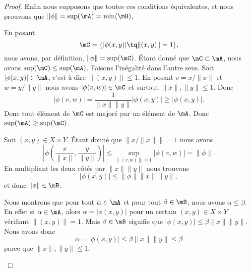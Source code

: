 \begin{proof}
    Enfin nous supposons que toutes ces conditions équivalentes, et nous prouvons que \( \| \phi \|=\sup(\mA)=\min(\mB)\).

    \begin{subproof}
        \spitem[\( \| \phi \|=\sup(\mA)\)]
        En posant
        \begin{equation}
            \mC=\{ | \phi(x,y) |\tq \| (x,y) \|=1 \}, 
        \end{equation}
        nous avons, par définition, \( \| \phi \|=\sup(\mC)\). Étant donné que \( \mC\subset\mA\), nous avons \( \sup(\mC)\leq \sup(\mA)\). Faisons l'inégalité dans l'autre sens. Soit \( | \phi(x,y) |\in\mA\), c'est à dire \( \| (x,y) \|\leq 1\). En posant \( v=x/\| x \|\) et \( w=y/\| y \|\) nous avons \( | \phi(v,w) |\in\mC\) et surtout \( \| x \|, \| y \|\leq 1\). Donc
        \begin{equation}
            | \phi(v,w) |=\frac{1}{ \| x \|\| y \| }| \phi(x,y) |\geq | \phi(x,y) |.
        \end{equation}
        Donc tout élément de \( \mC\) est majoré par un élément de \( \mA\). Donc \( \sup(\mA)\geq \sup(\mC)\).

        \spitem[\( \| \phi \|\in\mB\)]
    Soit \( (x,y)\in X\times Y\). Étant donné que \( \| x/\| x \| \|=1\) nous avons
    \begin{equation}
    \left| \phi\left( \frac{ x }{ \| x \| },\frac{ y }{ \| y \| } \right) \right|\leq \sup_{\| (v,w) \|=1}| \phi(v,w) |= \| \phi \|.
    \end{equation}
    En multipliant les deux côtés par \( \| x \|\| y \|\) nous trouvons
    \begin{equation}
        \left|   \phi(x,y) \right|\leq \| \phi \|\| x \|\| y \|,
    \end{equation}
    et donc \( \| \phi \|\in\mB\). 

    Nous montrons que pour tout \( \alpha\in \mA\) et pour tout \( \beta\in\mB\), nous avons \( \alpha\leq \beta\). En effet si \( \alpha\in \mA\), alors \( \alpha=| \phi(x,y) |\) pour un certain \( (x,y)\in X\times Y\) vérifiant \( \| (x,y) \|=1\). Mais \( \beta\in \mB\) signifie que \( | \phi(x,y)|\leq \beta\| x \|  \| y \| \). Nous avons donc
    \begin{equation}
        \alpha=| \phi(x,y) |\leq \beta\| x \|\| y \|\leq \beta
    \end{equation}
    parce que \( \| x \|,\| y \|\leq 1\).
    \end{subproof}
\end{proof}

